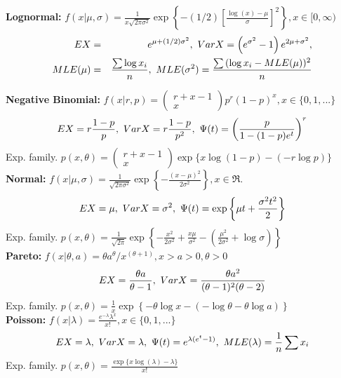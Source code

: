 \documentclass[11pt]{article}
\begin{document}
\noindent\textbf{Lognormal:} $f(x|\mu,\sigma) = \frac{1}{x\sqrt{2\pi\sigma^2}}\exp{\left\{ -(1/2)\left[\frac{\log{(x)}-\mu}{\sigma}\right]^2 \right\}}, x \in[0,\infty)$ 
\begin{eqnarray}
EX &=& e^{\mu+(1/2)\sigma^2}, \text{ }VarX = \left(e^{\sigma^2}-1\right)e^{2\mu + \sigma^2}, \notag \\
MLE(\mu) &=& \frac{\sum{\log{x_i}}}{n},\text{ } MLE(\sigma^2) = \frac{\sum{(\log{x_i} - MLE(\mu))^2}}{n} \notag
\end{eqnarray}

\noindent\textbf{Negative Binomial:} $f(x|r,p) = \left(\begin{array}{c} r+x-1 \\ x \end{array}\right)p^r(1-p)^x, x \in\{0,1,... \}$ 
\begin{eqnarray}
EX = r\frac{1-p}{p}, \text{ }VarX = r\frac{1-p}{p^2},\text{ } \Psi(t) = \left( \frac{p}{1-(1-p)e^t} \right)^r \notag
\end{eqnarray}
\indent Exp. family. $p(x,\theta) =\left(\begin{array}{c} r+x-1 \\ x \end{array}\right) \exp{\{ x\log{(1-p)} -(-r\log{p}) \}}$ \\

\noindent\textbf{Normal:} $f(x|\mu,\sigma)=\frac{1}{\sqrt{2\pi\sigma^2}}\exp{\left\{ -\frac{(x-\mu)^2}{2\sigma^2} \right\}}, x \in \Re $.
\begin{eqnarray}
EX = \mu, \text{ }VarX = \sigma^2,\text{ } \Psi(t) = \exp{\left\{ \mu t + \frac{\sigma^2t^2}{2} \right\}} \notag
\end{eqnarray}
\indent Exp. family. $p(x,\theta) =\frac{1}{\sqrt{2\pi}}\exp{\left\{ -\frac{x^2}{2\sigma^2} +\frac{x\mu}{\sigma^2} - 
\left(\frac{\mu^2}{2\sigma^2} + \log{\sigma}\right) \right\}}$ \\

\noindent\textbf{Pareto:} $f(x|\theta, a) = \theta a^{\theta} / x^{(\theta+1)}, x > a>0,\theta>0$
\begin{eqnarray}
 EX = \frac{\theta a}{\theta-1},\text{ }VarX = \frac{\theta a^2}{(\theta-1)^2(\theta-2)} \notag
\end{eqnarray}
\indent Exp. family. $p(x,\theta) = \frac{1}{x}\exp{\left\{ -\theta\log{x} - (-\log{\theta} - \theta\log{a}) \right\}}$ \\

\noindent\textbf{Poisson:} $f(x|\lambda) = \frac{e^{-\lambda}\lambda^x}{x!}, x \in \{0,1,...\}$
\begin{eqnarray}
EX = \lambda, \text{ }VarX = \lambda, \text{ }\Psi(t) = e^{\lambda(e^t -1)} ,\text{ }MLE(\lambda) = \frac{1}{n}\sum{x_i} \notag
\end{eqnarray}
\indent Exp. family. $p(x,\theta) = \frac{\exp{\{ x\log{(\lambda)} -\lambda \}}}{x!}$ \\
\end{document}
